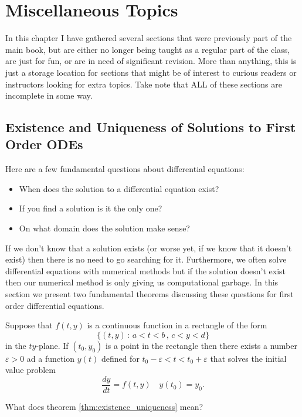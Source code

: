 \chapter{Miscellaneous Topics}

In this chapter I have gathered several sections that were previously part of the main book, but
are either no longer being taught as a regular part of the class, are just for fun, or are
in need of significant revision.  More than anything, this is just a storage location for
sections that might be of interest to curious readers or instructors looking for extra
topics.  Take note that ALL of these sections are incomplete in some way.



\section{Existence and Uniqueness of Solutions to First Order ODEs}
Here are a few fundamental questions about differential equations:
\begin{itemize}
    \item When does the solution to a differential equation exist?
    \item If you find a solution is it the only one?
    \item On what domain does the solution make sense?
\end{itemize}
If we don't know that a solution exists (or worse yet, if we know that it doesn't exist)
then there is no need to go searching for it.  Furthermore, we often solve differential
equations with numerical methods but if the solution doesn't exist then our numerical
method is only giving us computational garbage. 
In this section we present two fundamental theorems discussing these questions for first
order differential equations.  

\begin{thm}\label{thm:existence_uniqueness}
    Suppose that $f(t,y)$ is a continuous function in a rectangle of the form
    \[ \{ (t,y) \, : \, a < t < b \, , \, c < y < d \} \]
    in the $ty$-plane.  If $(t_0,y_0)$ is a point in the rectangle then there exists a
    number $\varepsilon > 0$ ad a function $y(t)$ defined for $t_0 - \varepsilon < t < t_0
    + \varepsilon$ that solves the initial value problem
    \[ \frac{dy}{dt} = f(t,y) \quad y(t_0) = y_0 . \]
\end{thm}
\begin{problem}
    What does theorem \ref{thm:existence_uniqueness} mean?
\end{problem}


